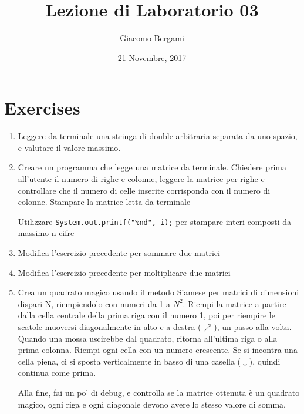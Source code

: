 \documentclass[]{scrartcl}
\title{Lezione di Laboratorio 03}
\date{21 Novembre, 2017}
\author{Giacomo Bergami}
\begin{document}
\maketitle
\section*{Exercises}

\begin{enumerate}
\item  Leggere da terminale una stringa di double arbitraria separata da uno spazio, e valutare il valore massimo.
\item Creare un programma che legge una matrice da terminale.
Chiedere prima all'utente il numero di righe e colonne, leggere la matrice per righe e controllare che il numero di celle inserite corrisponda con il numero di colonne.
Stampare la matrice letta da terminale

Utilizzare \texttt{System.out.printf("\%nd", i);} per stampare interi composti da massimo n cifre
\item Modifica l'esercizio precedente per sommare due matrici
\item  Modifica l'esercizio precedente per moltiplicare due matrici
\item Crea un quadrato magico usando il metodo Siamese per matrici di dimensioni dispari N, riempiendolo con numeri da 1 a $N^2$.
 Riempi la matrice a partire dalla cella centrale della prima riga con il numero 1,
 poi per riempire le scatole muoversi diagonalmente in alto e a destra ($ \nearrow$), un passo alla volta. Quando una mossa
 uscirebbe dal quadrato, ritorna all'ultima riga o alla prima colonna. Riempi ogni cella con un
 numero crescente. Se si incontra una cella piena, ci si sposta verticalmente in basso di una casella ($\downarrow$), quindi continua
 come prima.

 Alla fine, fai un po' di debug, e controlla se la matrice ottenuta è un quadrato magico, ogni riga e ogni diagonale
 devono avere lo stesso valore di somma.


\end{enumerate}
\end{document}
